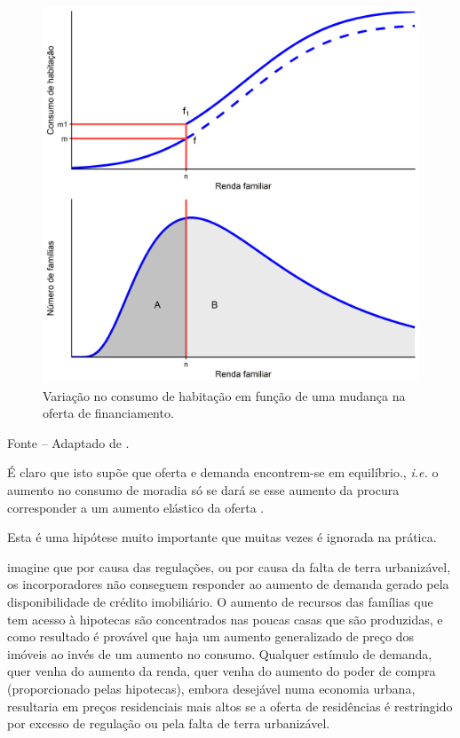 \documentclass[
	12pt,				%
	oneside,			%
	a4paper,			%
	chapter=TITLE,		%
	section=TITLE,		%
	english,			%
	brazil				%
	]{abntex2}
\newcommand{\bcenter}{\begin{center}}
\newcommand{\ecenter}{\end{center}}
\begin{document}
\begin{refsection}
\begin{figure}[H]
{\centering \includegraphics[width=0.7\linewidth]{images/ofertaHipotecas-1} 

}

\caption{Variação no consumo de habitação em função de uma mudança na oferta de financiamento.}\label{fig:ofertaHipotecas}
\end{figure}
\bcenter

Fonte -- Adaptado de \textcite[p.~255]{bertaud}.
\ecenter

É claro que isto supõe que oferta e demanda encontrem-se em equilíbrio., \emph{i.e.}
o aumento no consumo de moradia só se dará se esse aumento da procura
corresponder a um aumento elástico da oferta \autocite[220]{bertaud}.

Esta é uma hipótese muito importante que muitas vezes é ignorada na prática.
\begin{citacao}
imagine que por causa das regulações, ou por causa da falta de terra
urbanizável, os incorporadores não conseguem responder ao aumento de demanda
gerado pela disponibilidade de crédito imobiliário. O aumento de recursos das
famílias que tem acesso à hipotecas são concentrados nas poucas casas que são
produzidas, e como resultado é provável que haja um aumento generalizado de
preço dos imóveis ao invés de um aumento no consumo. Qualquer estímulo de
demanda, quer venha do aumento da renda, quer venha do aumento do poder de
compra (proporcionado pelas hipotecas), embora desejável numa economia urbana,
resultaria em preços residenciais mais altos se a oferta de residências é
restringido por excesso de regulação ou pela falta de terra urbanizável.
\cite[p. 255-256]{bertaud}
\end{citacao}
\hypertarget{regulauxe7uxe3o}{%
}
\end{refsection}
\end{document}
